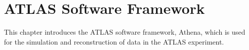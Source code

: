 \chapter{ATLAS Software Framework} \label{ch:ATLASSoftwareFramework}
This chapter introduces the ATLAS software framework, Athena, which is used for the simulation and reconstruction of data in the ATLAS experiment.